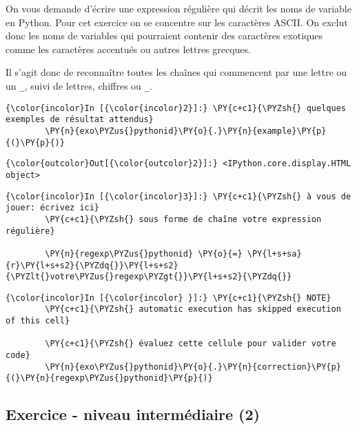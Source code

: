     On vous demande d'écrire une expression régulière qui décrit les noms de
variable en Python. Pour cet exercice on se concentre sur les caractères
ASCII. On exclut donc les noms de variables qui pourraient contenir des
caractères exotiques comme les caractères accentués ou autres lettres
grecques.

Il s'agit donc de reconnaître toutes les chaînes qui commencent par une
lettre ou un \texttt{\_}, suivi de lettres, chiffres ou \texttt{\_}.

    \begin{Verbatim}[commandchars=\\\{\}]
{\color{incolor}In [{\color{incolor}2}]:} \PY{c+c1}{\PYZsh{} quelques exemples de résultat attendus}
        \PY{n}{exo\PYZus{}pythonid}\PY{o}{.}\PY{n}{example}\PY{p}{(}\PY{p}{)}
\end{Verbatim}


\begin{Verbatim}[commandchars=\\\{\}]
{\color{outcolor}Out[{\color{outcolor}2}]:} <IPython.core.display.HTML object>
\end{Verbatim}
            
    \begin{Verbatim}[commandchars=\\\{\}]
{\color{incolor}In [{\color{incolor}3}]:} \PY{c+c1}{\PYZsh{} à vous de jouer: écrivez ici}
        \PY{c+c1}{\PYZsh{} sous forme de chaîne votre expression régulière}
        
        \PY{n}{regexp\PYZus{}pythonid} \PY{o}{=} \PY{l+s+sa}{r}\PY{l+s+s2}{\PYZdq{}}\PY{l+s+s2}{\PYZlt{}votre\PYZus{}regexp\PYZgt{}}\PY{l+s+s2}{\PYZdq{}}
\end{Verbatim}


    \begin{Verbatim}[commandchars=\\\{\}]
{\color{incolor}In [{\color{incolor} }]:} \PY{c+c1}{\PYZsh{} NOTE}
        \PY{c+c1}{\PYZsh{} automatic execution has skipped execution of this cell}
        
        \PY{c+c1}{\PYZsh{} évaluez cette cellule pour valider votre code}
        \PY{n}{exo\PYZus{}pythonid}\PY{o}{.}\PY{n}{correction}\PY{p}{(}\PY{n}{regexp\PYZus{}pythonid}\PY{p}{)}
\end{Verbatim}


    \hypertarget{exercice---niveau-intermuxe9diaire-2}{%
\subsection{Exercice - niveau intermédiaire
(2)}\label{exercice---niveau-intermuxe9diaire-2}}

